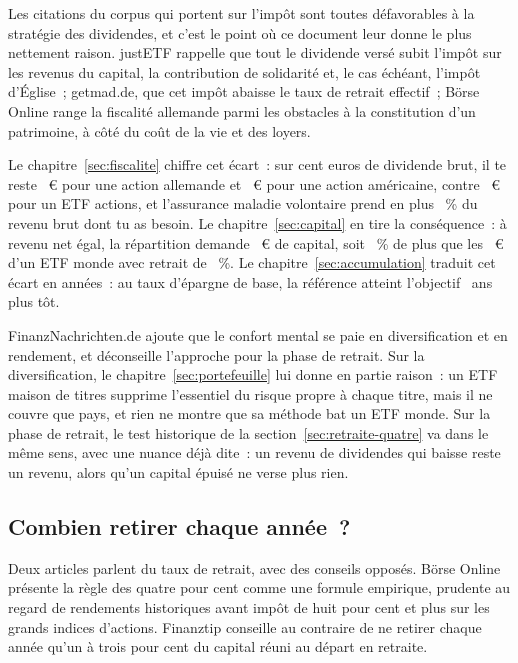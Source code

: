 Les \PresseCitationsFiscalite{} citations du corpus qui portent sur l'imp\^ot sont toutes
d\'efavorables \`a la strat\'egie des dividendes, et c'est le point o\`u ce document leur donne le plus
nettement raison. justETF rappelle que tout le dividende vers\'e subit l'imp\^ot sur les revenus du
capital, la contribution de solidarit\'e et, le cas \'ech\'eant, l'imp\^ot d'\'Eglise~; getmad.de, que
cet imp\^ot abaisse le taux de retrait effectif~; B\"orse Online range la fiscalit\'e allemande parmi
les obstacles \`a la constitution d'un patrimoine, \`a c\^ot\'e du co\^ut de la vie et des
loyers.

Le chapitre~\ref{sec:fiscalite} chiffre cet \'ecart~: sur cent euros de dividende brut, il te reste
\NettoDe~€ pour une action allemande et \NettoUs~€ pour une action am\'ericaine, contre \NettoEtf~€
pour un ETF actions, et l'assurance maladie volontaire prend en plus \KvPvAnteilBrut~\% du revenu brut
dont tu as besoin. Le chapitre~\ref{sec:capital} en tire la cons\'equence~: \`a revenu net \'egal, la
r\'epartition \ReferenzStrategie{} demande \KapitalMaisonSiebzig~€ de capital, soit
\KapitalDifferenzSiebzigProzent~\% de plus que les \KapitalEtfReferenz~€ d'un ETF monde avec retrait de
\TauxRetrait~\%. Le chapitre~\ref{sec:accumulation} traduit cet \'ecart en ann\'ees~: au taux
d'\'epargne de base, la r\'ef\'erence atteint l'objectif \EcartAgeEtfMaisonBasis~ans plus t\^ot.

FinanzNachrichten.de ajoute que le confort mental se paie en diversification et en rendement, et
d\'econseille l'approche pour la phase de retrait. Sur la diversification, le
chapitre~\ref{sec:portefeuille} lui donne en partie raison~: un ETF maison de \NombreTitres{} titres
supprime l'essentiel du risque propre \`a chaque titre, mais il ne couvre que \PortefeuillePays{} pays,
et rien ne montre que sa m\'ethode bat un ETF monde. Sur la phase de retrait, le test historique de la
section~\ref{sec:retraite-quatre} va dans le m\^eme sens, avec une nuance d\'ej\`a dite~: un revenu de
dividendes qui baisse reste un revenu, alors qu'un capital \'epuis\'e ne verse plus rien.

\subsection{Combien retirer chaque ann\'ee~?}\label{sec:presse-retrait}

Deux articles parlent du taux de retrait, avec des conseils oppos\'es. B\"orse Online pr\'esente la
r\`egle des quatre pour cent comme une formule empirique, prudente au regard de rendements historiques
avant imp\^ot de huit pour cent et plus sur les grands indices d'actions. Finanztip conseille au
contraire de ne retirer chaque ann\'ee qu'un \`a trois pour cent du capital r\'euni au d\'epart en
retraite.

